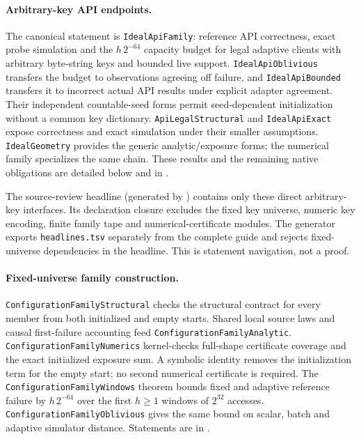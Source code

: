 \documentclass[11pt]{article}
\theoremstyle{definition}
\theoremstyle{remark}
\begin{document}
\paragraph{Arbitrary-key API endpoints.}
The canonical statement is \texttt{IdealApiFamily}: reference API correctness,
exact probe simulation and the $h\,2^{-64}$ capacity budget for legal adaptive
clients with arbitrary byte-string keys and bounded live support.
\texttt{IdealApiOblivious} transfers the budget to observations agreeing off
failure, and \texttt{IdealApiBounded} transfers it to incorrect actual API
results under explicit adapter agreement. Their independent countable-seed
forms permit seed-dependent initialization without a common key dictionary.
\texttt{ApiLegalStructural} and \texttt{IdealApiExact} expose correctness and
exact simulation under their smaller assumptions. \texttt{IdealGeometry}
provides the generic analytic/exposure forms; the numerical family specializes
the same chain. These results and the remaining native obligations are detailed
below and in .

The source-review headline (generated by )
contains only these direct arbitrary-key interfaces. Its declaration closure
excludes the fixed key universe, numeric key encoding, finite family tape and
numerical-certificate modules. The generator exports \texttt{headlines.tsv}
separately from the complete guide and rejects fixed-universe dependencies in
the headline. This is statement navigation, not a proof.

\paragraph{Fixed-universe family construction.}
\texttt{ConfigurationFamilyStructural} checks the structural contract for
every member from both initialized and empty starts. Shared local source laws
and causal first-failure accounting feed \texttt{ConfigurationFamilyAnalytic}.
\texttt{ConfigurationFamilyNumerics} kernel-checks full-shape certificate
coverage and the exact initialized exposure sum. A symbolic identity removes
the initialization term for the empty start; no second numerical certificate
is required. The \texttt{ConfigurationFamilyWindows} theorem bounds
fixed and adaptive reference failure by $h\,2^{-64}$ over the first $h\ge1$
windows of $2^{32}$ accesses. \texttt{ConfigurationFamilyOblivious} gives the
same bound on scalar, batch and adaptive simulator distance. Statements are in
.
\end{document}
